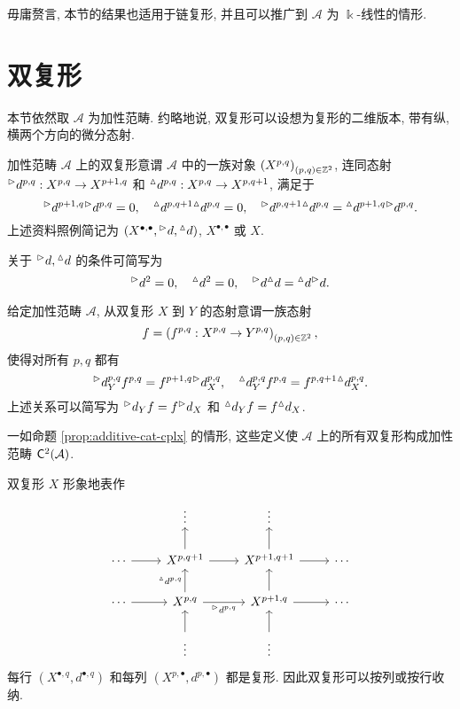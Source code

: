 毋庸赘言, 本节的结果也适用于链复形, 并且可以推广到 $\mathcal{A}$ 为 $\Bbbk$-线性的情形.

\section{双复形}\label{sec:double-cplx}
本节依然取 $\mathcal{A}$ 为加性范畴. 约略地说, 双复形可以设想为复形的二维版本, 带有纵, 横两个方向的微分态射.

\begin{definition}[双复形]\label{def:double-cplx}
	加性范畴 $\mathcal{A}$ 上的双复形意谓 $\mathcal{A}$ 中的一族对象 $\left( X^{p, q} \right)_{(p, q) \in \mathbb{Z}^2}$, 连同态射 ${}^\vartriangleright d^{p, q}: X^{p, q} \to X^{p+1, q}$ 和 ${}^\vartriangle d^{p, q}: X^{p, q} \to X^{p, q+1}$, 满足于
	\[ {}^\vartriangleright d^{p+1,q} {}^\vartriangleright d^{p,q} = 0, \quad {}^\vartriangle d^{p, q+1} {}^\vartriangle d^{p,q} = 0, \quad {}^\vartriangleright d^{p, q+1} {}^\vartriangle d^{p,q} = {}^\vartriangle d^{p+1, q} {}^\vartriangleright d^{p,q}. \]
	上述资料照例简记为 $(X^{\bullet, \bullet}, {}^\vartriangleright d, {}^\vartriangle d)$, $X^{\bullet, \bullet}$ 或 $X$.
\end{definition}

关于 ${}^\vartriangleright d, {}^\vartriangle d$ 的条件可简写为
\[ {}^\vartriangleright d^2 = 0, \quad {}^\vartriangle d^2 = 0, \quad {}^\vartriangleright d {}^\vartriangle d = {}^\vartriangle d {}^\vartriangleright d. \]

\begin{definition}\label{def:bicplx}
	给定加性范畴 $\mathcal{A}$, 从双复形 $X$ 到 $Y$ 的态射意谓一族态射
	\[ f = \left( f^{p,q}: X^{p, q} \to Y^{p, q} \right)_{(p, q) \in \mathbb{Z}^2}, \]
	使得对所有 $p, q$ 都有
	\[ {}^\vartriangleright d_Y^{p, q} f^{p, q} = f^{p+1, q} {}^\vartriangleright d_X^{p, q}, \quad {}^\vartriangle d_Y^{p, q} f^{p, q} = f^{p, q+1} {}^\vartriangle d_X^{p, q}. \]
	上述关系可以简写为 ${}^\vartriangleright d_Y f = f {}^\vartriangleright d_X$ 和 ${}^\vartriangle d_Y f = f {}^\vartriangle d_X$.
\end{definition}

一如命题 \ref{prop:additive-cat-cplx} 的情形, 这些定义使 $\mathcal{A}$ 上的所有双复形构成加性范畴 $\mathsf{C}^2(\mathcal{A})$.

双复形 $X$ 形象地表作
\[\begin{tikzcd}
	& \vdots & \vdots & \\
	\cdots \arrow[r] & X^{p, q+1} \arrow[r] \arrow[u] & X^{p+1, q+1} \arrow[r] \arrow[u] & \cdots \\
	\cdots \arrow[r] & X^{p, q} \arrow[r, "{\dhori^{p,q}}"'] \arrow[u, "{\dvert^{p,q}}"] & X^{p+1, q} \arrow[r] \arrow[u] & \cdots \\
	& \vdots \arrow[u] & \vdots \arrow[u] &
\end{tikzcd}\]
每行 $\left( X^{\bullet, q}, d^{\bullet, q} \right)$ 和每列 $\left( X^{p, \bullet}, d^{p, \bullet} \right)$ 都是复形. 因此双复形可以按列或按行收纳.

